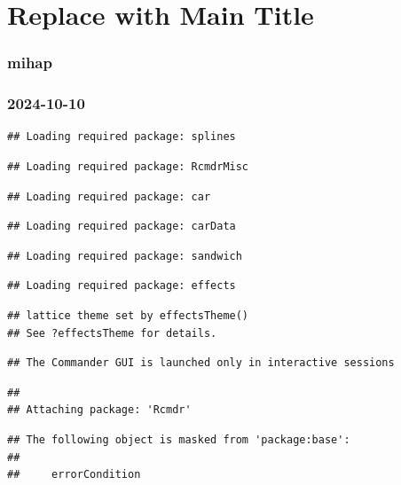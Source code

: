 \documentclass[
]{article}
\author{}
\date{\vspace{-2.5em}}
\begin{document}
\section{Replace with Main Title}\label{replace-with-main-title}

\subsubsection{mihap}\label{mihap}

\subsubsection{2024-10-10}\label{section}

\begin{verbatim}
## Loading required package: splines
\end{verbatim}

\begin{verbatim}
## Loading required package: RcmdrMisc
\end{verbatim}

\begin{verbatim}
## Loading required package: car
\end{verbatim}

\begin{verbatim}
## Loading required package: carData
\end{verbatim}

\begin{verbatim}
## Loading required package: sandwich
\end{verbatim}

\begin{verbatim}
## Loading required package: effects
\end{verbatim}

\begin{verbatim}
## lattice theme set by effectsTheme()
## See ?effectsTheme for details.
\end{verbatim}

\begin{verbatim}
## The Commander GUI is launched only in interactive sessions
\end{verbatim}

\begin{verbatim}
## 
## Attaching package: 'Rcmdr'
\end{verbatim}

\begin{verbatim}
## The following object is masked from 'package:base':
## 
##     errorCondition
\end{verbatim}
\end{document}
